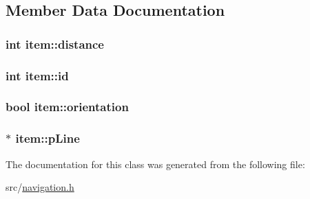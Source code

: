 \subsection{\-Member \-Data \-Documentation}
\hypertarget{classitem_a1f807e814f5e0068ff09532c5cfd9f1a}{
\subsubsection[{distance}]{\setlength{\rightskip}{0pt plus 5cm}int {\bf item\-::distance}}}\label{classitem_a1f807e814f5e0068ff09532c5cfd9f1a}
\hypertarget{classitem_ad073d1c2b50db649b29c7b87d04c4c4c}{
\subsubsection[{id}]{\setlength{\rightskip}{0pt plus 5cm}int {\bf item\-::id}}}\label{classitem_ad073d1c2b50db649b29c7b87d04c4c4c}
\hypertarget{classitem_aeafa2b668217f6960f0d98aa6395cd85}{
\subsubsection[{orientation}]{\setlength{\rightskip}{0pt plus 5cm}bool {\bf item\-::orientation}}}\label{classitem_aeafa2b668217f6960f0d98aa6395cd85}
\hypertarget{classitem_a1b763ddd70a3ce06fddbfec4733520b8}{
\subsubsection[{p\-Line}]{$\ast$ {\bf item\-::p\-Line}}}\label{classitem_a1b763ddd70a3ce06fddbfec4733520b8}


\-The documentation for this class was generated from the following file\-:\begin{DoxyCompactItemize}
\item 
src/\hyperlink{navigation_8h}{navigation.\-h}\end{DoxyCompactItemize}
